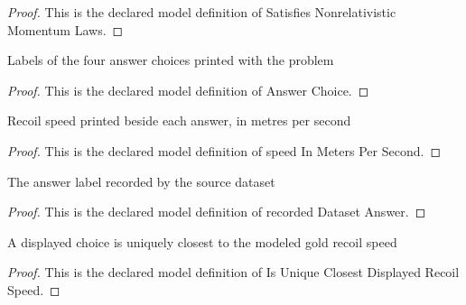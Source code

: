 \begin{proof}
  This is the declared model definition of Satisfies Nonrelativistic Momentum Laws.
\end{proof}
\begin{definition}
  \label{def:physics:phyx-mini-0641:phyxminiproblems-problemphyxmini0641-answerchoice}
  Labels of the four answer choices printed with the problem
\end{definition}
\begin{proof}
  This is the declared model definition of Answer Choice.
\end{proof}
\begin{definition}
  \label{def:physics:phyx-mini-0641:phyxminiproblems-problemphyxmini0641-answerchoice-speedinmeterspersecond}
  Recoil speed printed beside each answer, in metres per second
\end{definition}
\begin{proof}
  This is the declared model definition of speed In Meters Per Second.
\end{proof}
\begin{definition}
  \label{def:physics:phyx-mini-0641:phyxminiproblems-problemphyxmini0641-recordeddatasetanswer}
  The answer label recorded by the source dataset
\end{definition}
\begin{proof}
  This is the declared model definition of recorded Dataset Answer.
\end{proof}
\begin{definition}
  \label{def:physics:phyx-mini-0641:phyxminiproblems-problemphyxmini0641-isuniqueclosestdisplayedrecoilspeed}
  A displayed choice is uniquely closest to the modeled gold recoil speed
\end{definition}
\begin{proof}
  This is the declared model definition of Is Unique Closest Displayed Recoil Speed.
\end{proof}
